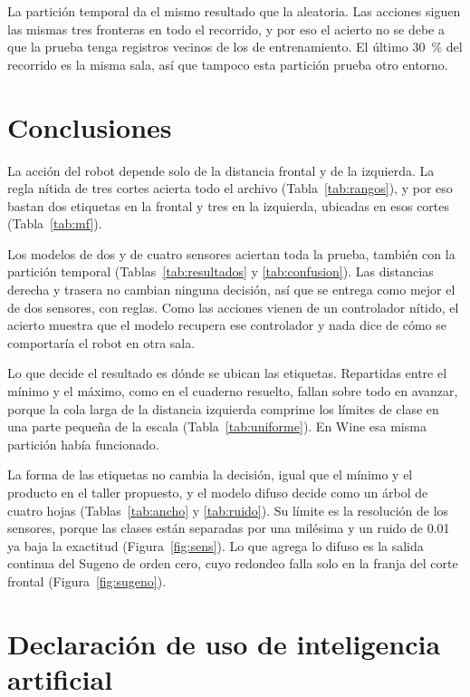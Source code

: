 \documentclass[11pt,letterpaper]{article}
\begin{document}
La partición temporal da el mismo resultado que la aleatoria. Las acciones siguen las mismas tres fronteras en todo el recorrido, y por eso el acierto no se debe a que la prueba tenga registros vecinos de los de entrenamiento. El último 30~\% del recorrido es la misma sala, así que tampoco esta partición prueba otro entorno.

\section{Conclusiones}

La acción del robot depende solo de la distancia frontal y de la izquierda. La regla nítida de tres cortes acierta todo el archivo (Tabla~\ref{tab:rangos}), y por eso bastan dos etiquetas en la frontal y tres en la izquierda, ubicadas en esos cortes (Tabla~\ref{tab:mf}).

Los modelos de dos y de cuatro sensores aciertan toda la prueba, también con la partición temporal (Tablas~\ref{tab:resultados} y \ref{tab:confusion}). Las distancias derecha y trasera no cambian ninguna decisión, así que se entrega como mejor el de dos sensores, con \reglasDos{} reglas. Como las acciones vienen de un controlador nítido, el acierto muestra que el modelo recupera ese controlador y nada dice de cómo se comportaría el robot en otra sala.

Lo que decide el resultado es dónde se ubican las etiquetas. Repartidas entre el mínimo y el máximo, como en el cuaderno resuelto, fallan sobre todo en avanzar, porque la cola larga de la distancia izquierda comprime los límites de clase en una parte pequeña de la escala (Tabla~\ref{tab:uniforme}). En Wine esa misma partición había funcionado.

La forma de las etiquetas no cambia la decisión, igual que el mínimo y el producto en el taller propuesto, y el modelo difuso decide como un árbol de cuatro hojas (Tablas~\ref{tab:ancho} y \ref{tab:ruido}). Su límite es la resolución de los sensores, porque las clases están separadas por una milésima y un ruido de 0.01 ya baja la exactitud (Figura~\ref{fig:sens}). Lo que agrega lo difuso es la salida continua del Sugeno de orden cero, cuyo redondeo falla solo en la franja del corte frontal (Figura~\ref{fig:sugeno}).

\section{Declaración de uso de inteligencia artificial}
\end{document}
